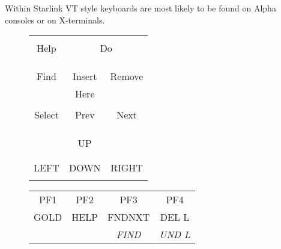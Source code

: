 \documentclass[twoside,11pt]{article}
\begin{document}
Within Starlink VT style keyboards are most likely to be found on Alpha
consoles or on X-terminals.
\begin{figure}[t]
\scriptsize
\begin{center}
\begin{tabular}{ccc} \hline
\multicolumn{1}{|c|}{}       & \multicolumn{2}{|c|}{}  \\           
\multicolumn{1}{|c|}{Help}    & \multicolumn{2}{|c|}{Do} \\
\multicolumn{1}{|c|}{}       & \multicolumn{2}{|c|}{}  \\  \hline
         &              &        \\ \hline
\multicolumn{1}{|c|}{} & \multicolumn{1}{|c|}{} & \multicolumn{1}{|c|}{} \\
\multicolumn{1}{|c|}{{Find}}    &  \multicolumn{1}{|c|}{Insert} & 
\multicolumn{1}{|c|}{Remove} \\
\multicolumn{1}{|c|}{} & \multicolumn{1}{|c|}{Here} & \multicolumn{1}{|c|}{} \\
\hline
\multicolumn{1}{|c|}{} & \multicolumn{1}{|c|}{} & \multicolumn{1}{|c|}{} \\
\multicolumn{1}{|c|}{Select}    &  \multicolumn{1}{|c|}{Prev} & 
\multicolumn{1}{|c|}{Next} \\
\multicolumn{1}{|c|}{} & \multicolumn{1}{|c|}{} & \multicolumn{1}{|c|}{} \\
\hline
         &              &        \\ \cline{2-2}
        & \multicolumn{1}{|c|}{}  & \\
        & \multicolumn{1}{|c|}{UP}  & \\
        & \multicolumn{1}{|c|}{}  & \\ \hline
\multicolumn{1}{|c|}{} & \multicolumn{1}{|c|}{} & \multicolumn{1}{|c|}{} \\
\multicolumn{1}{|c|}{LEFT}    &  \multicolumn{1}{|c|}{DOWN} & 
\multicolumn{1}{|c|}{RIGHT} \\
\multicolumn{1}{|c|}{} & \multicolumn{1}{|c|}{} & \multicolumn{1}{|c|}{} \\
\hline
\end{tabular}
\hspace{5mm}
\begin{tabular}{|c|c|c|c|} \hline
PF1      & PF2       & PF3     & PF4   \\
GOLD     & HELP      & FNDNXT  & DEL L \\
         &           & \textit{FIND}    & \textit{UND L} \\ \hline

\end{tabular}
\end{center}
\end{figure}
\end{document}
